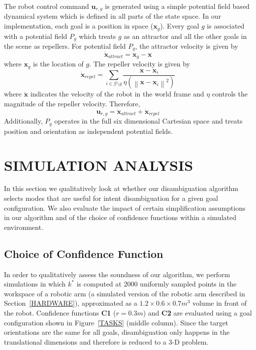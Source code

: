 \documentclass[conference]{IEEEtran}
\newcommand{\norm}[1]{\left\lVert#1\right\rVert}
\begin{document}
The robot control command $\boldsymbol{u}_{r,g}$ is generated using a simple potential field based dynamical system which is defined in all parts of the state space. In our implementation, each goal is a position in space ($\boldsymbol{x}_g$). Every goal $g$ is associated with a potential field $P_g$ which treats $g$ as an attractor and all the other goals in the scene as repellers. For potential field $P_g$, the attractor velocity is given by
\begin{equation*}
\dot{\boldsymbol{x}}_{attract} = \boldsymbol{x}_{g} - \boldsymbol{x}
\end{equation*}
where $\boldsymbol{x}_{g}$ is the location of $g$. The repeller velocity is given by
\begin{equation*}
\dot{\boldsymbol{x}}_{repel} = \sum_{i \in \mathcal{G} \setminus g} \frac{\boldsymbol{x} - \boldsymbol{x}_{i}}{\eta(\norm{\boldsymbol{x} - \boldsymbol{x}_{i}}^2)}
\end{equation*}
where $\dot{\boldsymbol{x}}$ indicates the velocity of the robot in the world frame and $\eta$ controls the magnitude of the repeller velocity. Therefore, 
\begin{equation*}
\boldsymbol{u}_{r,g} = \dot{\boldsymbol{x}}_{attract} + \dot{\boldsymbol{x}}_{repel} 
\end{equation*}
Additionally, $P_g$ operates in the full six dimensional Cartesian space and treats position and orientation as independent potential fields. 

\section{SIMULATION ANALYSIS} \label{SIMRESULTS}
In this section we qualitatively look at whether our disambiguation algorithm selects modes that are useful for intent disambiguation for a given goal configuration. We also evaluate the impact of certain simplification assumptions in our algorithm and of the choice of confidence functions within a simulated environment.

\subsection{Choice of Confidence Function}
In order to qualitatively assess the soundness of our algorithm, we perform simulations in which $k^*$ is computed at $2000$ uniformly sampled points in the workspace of a robotic arm (a simulated version of the robotic arm described in Section~\ref{HARDWARE}), approximated as a $1.2\times0.6\times0.7 m^3$ volume in front of the robot. Confidence functions \textbf{C1} ($r=0.3m$) and \textbf{C2} are evaluated using a goal configuration shown in Figure~\ref{TASKS} (middle column). Since the target orientations are the same for all goals, disambiguation only happens in the translational dimensions and therefore is reduced to a 3-D problem.
\end{document}
